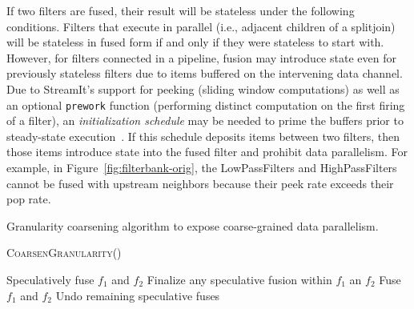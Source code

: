 If two filters are fused, their result will be stateless under the
following conditions.  Filters that execute in parallel (i.e.,
adjacent children of a splitjoin) will be stateless in fused form if
and only if they were stateless to start with.  However, for filters
connected in a pipeline, fusion may introduce state even for
previously stateless filters due to items buffered on the intervening
data channel.  Due to StreamIt's support for peeking (sliding window
computations) as well as an optional {\tt prework} function
(performing distinct computation on the first firing of a filter), an
{\it initialization schedule} may be needed to prime the buffers prior
to steady-state execution~\cite{karczma02thesis}.  If this schedule
deposits items between two filters, then those items introduce state
into the fused filter and prohibit data parallelism.  For example, in
Figure~\ref{fig:filterbank-orig}, the LowPassFilters and
HighPassFilters cannot be fused with upstream neighbors because their
peek rate exceeds their pop rate.


\begin{algorithm}[t]
\caption{Granularity coarsening algorithm to expose coarse-grained
data parallelism. \label{fig:coarsening-code}}
\textsc{CoarsenGranularity}()
\begin{algorithmic}
\Repeat
			\State Speculatively fuse $f_1$ and $f_2$
			\State Finalize any speculative fusion within
$f_1$ an $f_2$
			\State Fuse $f_1$ and $f_2$
		\EndIf
	\EndFor
{}
\State Undo remaining speculative fuses	
\end{algorithmic}
\end{algorithm}



